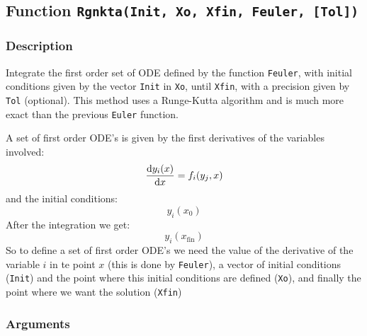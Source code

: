\subsection{Function \texttt{Rgnkta(Init, Xo, Xfin, Feuler, [Tol])}}

\subsubsection{Description}

Integrate the first order set of ODE defined by the function
\texttt{Feuler}, with initial conditions given by the vector
\texttt{Init} in \texttt{Xo}, until \texttt{Xfin}, with a precision
given by \texttt{Tol} (optional). This method uses a Runge-Kutta
algorithm and is much more exact than the previous \texttt{Euler}
function. 

A set of first order ODE's is given by the first derivatives of the
variables involved:
\begin{displaymath}
  \frac{\mathrm{d} y_i(x)}{\mathrm{d} x} = f_i(y_j, x)
\end{displaymath}
and the initial conditions:
\begin{displaymath}
  y_i(x_0)
\end{displaymath}
After the integration we get:
\begin{displaymath}
  y_i(x_{\text{fin}})
\end{displaymath}
So to define a set of first order ODE's we need the value of the
derivative of the variable $i$ in te point $x$ (this is done by
\texttt{Feuler}), a vector of initial conditions (\texttt{Init}) and
the point where this initial conditions are defined (\texttt{Xo}), and
finally the point where we want the solution (\texttt{Xfin})

\subsubsection{Arguments}

